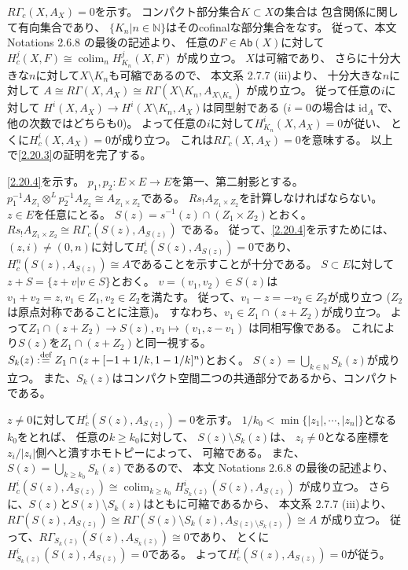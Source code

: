 \documentclass[uplatex,dvipdfmx]{jsarticle}
\makeatletter
\theoremstyle{definition}
\renewenvironment{proof}[1][\proofname]{
  \pushQED{\qed}%
  \normalfont \topsep6\p@\@plus6\p@\relax
  \trivlist
  \item[\hskip\labelsep
    #1\@addpunct{\textbf{.}}]\ignorespaces
}{%
  \popQED\endtrivlist\@endpefalse
}
\providecommand{\proofname}{証明}
\DeclareMathOperator{\id}{\mathrm{id}}
\DeclareMathOperator{\colim}{\mathrm{colim}}
\newcommand{\Ab}{\mathsf{Ab}}
\newcommand\N{\mathbb{N}}
\def\dfn{:\overset{\mbox{{\scriptsize def}}}{=}}
\makeatother
\begin{document}
\begin{proof}
  \(R\Gamma_c(X,A_X) = 0\)を示す。
  コンパクト部分集合\(K\subset X\)の集合は
  包含関係に関して有向集合であり、
  \(\{K_n | n\in \N\}\)はそのcofinalな部分集合をなす。
  従って、本文 Notations 2.6.8 の最後の記述より、
  任意の\(F\in \Ab(X)\)に対して
  \(H^j_c(X,F)\cong \colim_n H^j_{K_n}(X,F)\)
  が成り立つ。
  \(X\)は可縮であり、
  さらに十分大きな\(n\)に対して\(X\setminus K_n\)も可縮であるので、
  本文系 2.7.7 (iii)より、
  十分大きな\(n\)に対して
  \(A\cong R\Gamma(X,A_X)\cong R\Gamma(X\setminus K_n, A_{X\setminus K_n})\)
  が成り立つ。
  従って任意の\(i\)に対して
  \(H^i(X,A_X) \to H^i(X\setminus K_n, A_X)\)は同型射である
  (\(i=0\)の場合は\(\id_A\)で、他の次数ではどちらも\(0\))。
  よって任意の\(i\)に対して\(H^i_{K_n}(X,A_X)=0\)が従い、
  とくに\(H^i_c(X,A_X)=0\)が成り立つ。
  これは\(R\Gamma_c(X,A_X)=0\)を意味する。
  以上で\ref{2.20.3}の証明を完了する。

  \ref{2.20.4}を示す。
  \(p_1,p_2:E\times E\to E\)を第一、第二射影とする。
  \(p_1^{-1}A_{Z_1}\otimes^L p_2^{-1}A_{Z_2}\cong A_{Z_1\times Z_2}\)である。
  \(Rs_!A_{Z_1\times Z_2}\)を計算しなければならない。
  \(z\in E\)を任意にとる。
  \(S(z) = s^{-1}(z)\cap (Z_1\times Z_2)\)とおく。
  \(Rs_!A_{Z_1\times Z_2}\cong R\Gamma_c(S(z),A_{S(z)})\)
  である。
  従って、\ref{2.20.4}を示すためには、
  \((z,i)\neq (0,n)\)に対して\(H^i_c(S(z),A_{S(z)}) = 0\)であり、
  \(H^n_c(S(z),A_{S(z)})\cong A\)であることを示すことが十分である。
  \(S\subset E\)に対して
  \(z+S = \{z+v | v\in S\}\)とおく。
  \(v = (v_1,v_2)\in S(z)\)は
  \(v_1+v_2 = z, v_1\in Z_1,v_2\in Z_2\)を満たす。
  従って、\(v_1-z = -v_2 \in Z_2\)が成り立つ
  (\(Z_2\)は原点対称であることに注意)。
  すなわち、\(v_1\in Z_1\cap (z+Z_2)\)が成り立つ。
  よって\(Z_1\cap (z+Z_2) \to S(z), v_1\mapsto (v_1,z-v_1)\)
  は同相写像である。
  これにより\(S(z)\)を\(Z_1\cap (z+Z_2)\)と同一視する。
  \(S_k(z) \dfn Z_1\cap (z+[-1+1/k,1-1/k]^n)\)とおく。
  \(S(z) = \bigcup_{k\in \N}S_k(z)\)が成り立つ。
  また、\(S_k(z)\)はコンパクト空間二つの共通部分であるから、コンパクトである。

  \(z\neq 0\)に対して\(H^i_c(S(z),A_{S(z)})=0\)を示す。
  \(1/k_0 < \min\{|z_1|,\cdots,|z_n|\}\)となる\(k_0\)をとれば、
  任意の\(k \geq k_0\)に対して、
  \(S(z)\setminus S_k(z)\)は、
  \(z_i\neq 0\)となる座標を\(z_i/|z_i|\)側へと潰すホモトピーによって、
  可縮である。
  また、\(S(z) = \bigcup_{k\geq k_0}S_k(z)\)であるので、
  本文 Notations 2.6.8 の最後の記述より、
  \(H^i_c(S(z),A_{S(z)}) \cong \colim_{k\geq k_0} H^i_{S_k(z)}(S(z),A_{S(z)})\)
  が成り立つ。
  さらに、\(S(z)\)と\(S(z)\setminus S_k(z)\)はともに可縮であるから、
  本文系 2.7.7 (iii)より、
  \(R\Gamma(S(z),A_{S(z)})\cong
  R\Gamma(S(z)\setminus S_k(z),A_{S(z)\setminus S_k(z)})\cong A\)
  が成り立つ。
  従って、\(R\Gamma_{S_k(z)}(S(z),A_{S_k(z)})\cong 0\)であり、
  とくに\(H^i_{S_k(z)}(S(z),A_{S(z)}) = 0\)である。
  よって\(H^i_c(S(z),A_{S(z)}) = 0\)が従う。


\end{proof}
\end{document}
